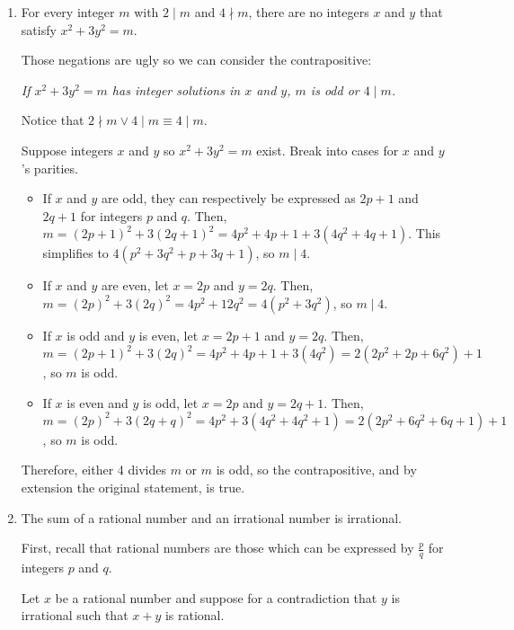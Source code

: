\begin{enumerate}
  \item For every integer $m$ with $2 \mid m$ and $4 \nmid m$, there are no integers $x$ and $y$ that satisfy $x^2 + 3y^2 = m$.
        \begin{prf}
          Those negations are ugly so we can consider the contrapositive:
          \begin{center}
            \emph{If $x^2 + 3y^2 = m$ has integer solutions in $x$ and $y$, $m$ is odd or $4 \mid m$.}
          \end{center}
          Notice that $2 \nmid m \lor 4 \mid m \equiv 4 \mid m$.

          Suppose integers $x$ and $y$ so $x^2 + 3y^2 = m$ exist.
          Break into cases for $x$ and $y$'s parities.

          \begin{itemize}
            \item If $x$ and $y$ are odd, they can respectively be expressed as $2p+1$ and $2q+1$ for integers $p$ and $q$.
                  Then, $m = (2p+1)^2 + 3(2q+1)^2 = 4p^2 + 4p + 1 + 3(4q^2 + 4q + 1)$.
                  This simplifies to $4(p^2+3q^2+p+3q+1)$, so $m \mid 4$.
            \item If $x$ and $y$ are even, let $x = 2p$ and $y = 2q$.
                  Then, $m = (2p)^2 + 3(2q)^2 = 4p^2 + 12q^2 = 4(p^2 + 3q^2)$, so $m \mid 4$.
            \item If $x$ is odd and $y$ is even, let $x = 2p+1$ and $y = 2q$.
                  Then, $m = (2p+1)^2 + 3(2q)^2 = 4p^2 + 4p + 1 + 3(4q^2) = 2(2p^2 + 2p + 6q^2) + 1$, so $m$ is odd.
            \item If $x$ is even and $y$ is odd, let $x = 2p$ and $y = 2q+1$.
                  Then, $m = (2p)^2 + 3(2q+q)^2 = 4p^2 + 3(4q^2+4q^2+1) = 2(2p^2 + 6q^2 + 6q + 1) + 1$, so $m$ is odd.
          \end{itemize}

          Therefore, either 4 divides $m$ or $m$ is odd, so the contrapositive, and by extension the original statement, is true.
        \end{prf}

  \item The sum of a rational number and an irrational number is irrational.
        \begin{prf}
          First, recall that rational numbers are those which can be expressed by $\frac{p}{q}$ for integers $p$ and $q$.

          Let $x$ be a rational number and suppose for a contradiction that $y$ is irrational such that $x+y$ is rational.


\end{prf}
\end{enumerate}
